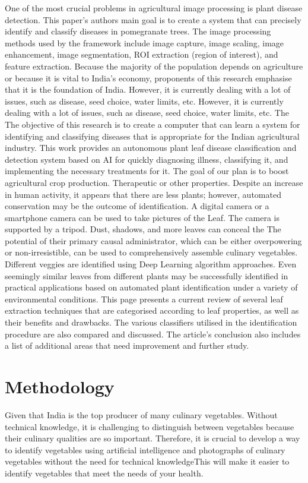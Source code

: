 \documentclass[a4paper,fleqn]{cas-sc}
\begin{document}
One of the most crucial problems in agricultural image processing is plant disease detection. This paper's authors \cite{goyal2018recent, anderson1942races, carter2000immune, van1999comprehensive} main goal is to create a system that can precisely identify and classify diseases in pomegranate trees. The image processing methods used by the framework include image capture, image scaling, image enhancement, image segmentation, ROI extraction (region of interest), and feature extraction. Because the majority of the population depends on agriculture or because it is vital to India's economy, proponents of this research \cite{babu2021comparative} emphasise that it is the foundation of India. However, it is currently dealing with a lot of issues, such as disease, seed choice, water limits, etc. However, it is currently dealing with a lot of issues, such as disease, seed choice, water limits, etc. The The objective of this research is to create a computer that can learn a system for identifying and classifying diseases that is appropriate for the Indian agricultural industry. This work \cite{sharma2020classification} provides an autonomous plant leaf disease classification and detection system based on AI for quickly diagnosing illness, classifying it, and implementing the necessary treatments for it. The goal of our plan is to boost agricultural crop production. Therapeutic or other properties. Despite an increase in human activity, it appears that there are less plants; however, automated conservation may be the outcome of identification. A digital camera or a smartphone camera can be used to take pictures of the Leaf. The camera is supported by a tripod. Dust, shadows, and more leaves can conceal the The potential of their primary causal administrator, which can be either overpowering or non-irresistible, can be used to comprehensively assemble culinary vegetables. Different veggies are identified using Deep Learning algorithm approaches.  
Even seemingly similar leaves from different plants may be successfully identified in practical applications based on automated plant identification under a variety of environmental conditions. This page presents a current review of several leaf extraction techniques that are categorised according to leaf properties, as well as their benefits and drawbacks. The various classifiers utilised in the identification procedure are also compared and discussed. The article's conclusion also includes a list of additional areas that need improvement and further study.

\section{Methodology}
Given that India is the top producer of many culinary vegetables. Without technical knowledge, it is challenging to distinguish between vegetables because their culinary qualities are so important. Therefore, it is crucial to develop a way to identify vegetables using artificial intelligence and photographs of culinary vegetables without the need for technical knowledgeThis will make it easier to identify vegetables that meet the needs of your health.
\end{document}
